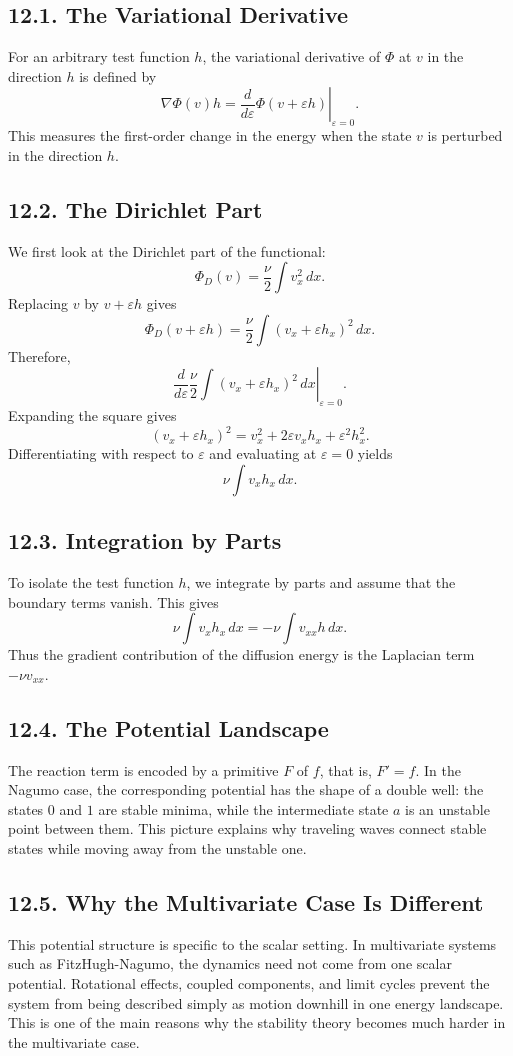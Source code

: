 \documentclass[11pt]{article}
\theoremstyle{definition}
\theoremstyle{remark}
\begin{document}
\subsection*{12.1. The Variational Derivative}
For an arbitrary test function $h$, the variational derivative of $\Phi$ at $v$ in the direction $h$ is defined by
\[
\nabla\Phi(v)h
=
\left.\frac{d}{d\varepsilon}\Phi(v+\varepsilon h)\right|_{\varepsilon=0}.
\]
This measures the first-order change in the energy when the state $v$ is perturbed in the direction $h$.

\subsection*{12.2. The Dirichlet Part}
We first look at the Dirichlet part of the functional:
\[
\Phi_D(v)=\frac{\nu}{2}\int v_x^2\,dx.
\]
Replacing $v$ by $v+\varepsilon h$ gives
\[
\Phi_D(v+\varepsilon h)=\frac{\nu}{2}\int (v_x+\varepsilon h_x)^2\,dx.
\]
Therefore,
\[
\left.\frac{d}{d\varepsilon}
\frac{\nu}{2}\int (v_x+\varepsilon h_x)^2\,dx
\right|_{\varepsilon=0}.
\]
Expanding the square gives
\[
(v_x+\varepsilon h_x)^2
=
v_x^2+2\varepsilon v_xh_x+\varepsilon^2 h_x^2.
\]
Differentiating with respect to $\varepsilon$ and evaluating at $\varepsilon=0$ yields
\[
\nu\int v_xh_x\,dx.
\]

\subsection*{12.3. Integration by Parts}
To isolate the test function $h$, we integrate by parts and assume that the boundary terms vanish. This gives
\[
\nu\int v_xh_x\,dx
=
-\nu\int v_{xx}h\,dx.
\]
Thus the gradient contribution of the diffusion energy is the Laplacian term $-\nu v_{xx}$.

\subsection*{12.4. The Potential Landscape}
The reaction term is encoded by a primitive $F$ of $f$, that is, $F'=f$. In the Nagumo case, the corresponding potential has the shape of a double well: the states $0$ and $1$ are stable minima, while the intermediate state $a$ is an unstable point between them. This picture explains why traveling waves connect stable states while moving away from the unstable one.

\subsection*{12.5. Why the Multivariate Case Is Different}
This potential structure is specific to the scalar setting. In multivariate systems such as FitzHugh-Nagumo, the dynamics need not come from one scalar potential. Rotational effects, coupled components, and limit cycles prevent the system from being described simply as motion downhill in one energy landscape. This is one of the main reasons why the stability theory becomes much harder in the multivariate case.
\end{document}
